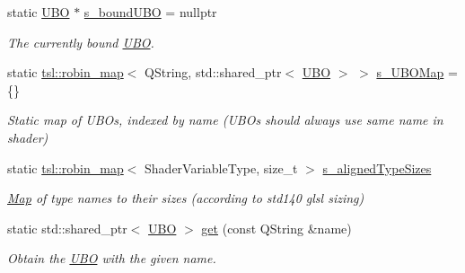 \begin{DoxyCompactItemize}
\item 
\mbox{\label{classrev_1_1_u_b_o_ab002dc2829909d0df5d4459bb9c395e3}} 
static \mbox{\hyperlink{classrev_1_1_u_b_o}{U\+BO}} $\ast$ \mbox{\hyperlink{classrev_1_1_u_b_o_ab002dc2829909d0df5d4459bb9c395e3}{s\+\_\+bound\+U\+BO}} = nullptr
\begin{DoxyCompactList}\small\item\em The currently bound \mbox{\hyperlink{classrev_1_1_u_b_o}{U\+BO}}. \end{DoxyCompactList}\item 
\mbox{\label{classrev_1_1_u_b_o_a93b54ee0b5d29cc642471bca227de174}} 
static \mbox{\hyperlink{classtsl_1_1robin__map}{tsl\+::robin\+\_\+map}}$<$ Q\+String, std\+::shared\+\_\+ptr$<$ \mbox{\hyperlink{classrev_1_1_u_b_o}{U\+BO}} $>$ $>$ \mbox{\hyperlink{classrev_1_1_u_b_o_a93b54ee0b5d29cc642471bca227de174}{s\+\_\+\+U\+B\+O\+Map}} = \{\}
\begin{DoxyCompactList}\small\item\em Static map of U\+B\+Os, indexed by name (U\+B\+Os should always use same name in shader) \end{DoxyCompactList}\item 
static \mbox{\hyperlink{classtsl_1_1robin__map}{tsl\+::robin\+\_\+map}}$<$ Shader\+Variable\+Type, size\+\_\+t $>$ \mbox{\hyperlink{classrev_1_1_u_b_o_a6ab2b09b1c7b5dfc548111d73a52020d}{s\+\_\+aligned\+Type\+Sizes}}
\begin{DoxyCompactList}\small\item\em \mbox{\hyperlink{classrev_1_1_map}{Map}} of type names to their sizes (according to std140 glsl sizing) \end{DoxyCompactList}\item 
\mbox{\label{classrev_1_1_u_b_o_a1b1324ca1dad3fb2a4b52e62b3565512}} 
static std\+::shared\+\_\+ptr$<$ \mbox{\hyperlink{classrev_1_1_u_b_o}{U\+BO}} $>$ \mbox{\hyperlink{classrev_1_1_u_b_o_a1b1324ca1dad3fb2a4b52e62b3565512}{get}} (const Q\+String \&name)
\begin{DoxyCompactList}\small\item\em Obtain the \mbox{\hyperlink{classrev_1_1_u_b_o}{U\+BO}} with the given name. \end{DoxyCompactList}\item 
\mbox{\label{classrev_1_1_u_b_o_a9cebf7ec595eaede526a33eb740ff662}} 

\end{DoxyCompactItemize}
